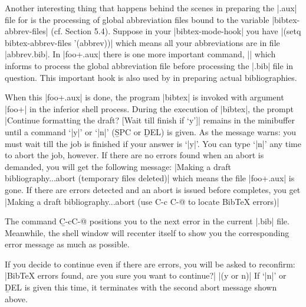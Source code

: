 Another interesting thing that happens behind the scenes in preparing
the |.aux| file for {\BibTeX} is the processing of global abbreviation files
bound to the variable |bibtex-abbrev-files| (cf. Section 5.4).
Suppose in your |bibtex-mode-hook| you have
\begindisplay
|(setq bibtex-abbrev-files '(abbrev))|\cr
\enddisplay
which means all your abbreviations are in file |abbrev.bib|.  In |foo+.aux|
there is one more important command,
\begindisplay
||\cr
\enddisplay
which informs {\BibTeX} to process the global abbreviation file before
processing the |.bib| file in question.  This important hook is
also used by {\TM} in preparing actual bibliographies.

When this |foo+.aux| is done,
the program |bibtex| is invoked with argument |foo+| in the
inferior shell process.  During the execution of |bibtex|,
the prompt
\begindisplay
|Continue formatting the draft? [Wait till finish if `y']|\cr
\enddisplay
remains in the minibuffer until a command `|y|' or `|n|' ({\b SPC} or
{\b DEL}) is given.  As the message warns: you must wait till the job
is finished if your answer is `|y|'.  You can type `|n|' any time
to abort the {\BibTeX} job, however.
If there are no errors found when an abort is demanded, you will get the
following message:
\begindisplay
|Making a draft bibliography...abort (temporary files deleted)|\cr
\enddisplay
which means the file |foo+.aux| is gone.  If there are errors detected
and an abort is issued before {\BibTeX} completes, you get
\begindisplay
|Making a draft bibliography...abort (use C-c C-@ to locate BibTeX errors)|\cr
\enddisplay

The command {\b C-c{\s}C-@} positions you to the next error in the current
|.bib| file.  Meanwhile, the shell window will recenter itself to show you
the corresponding error message as much as possible.

If you decide to continue even if there are {\BibTeX} errors, you will be
asked to reconfirm:
\begindisplay
|BibTeX errors found, are you sure you want to continue?| |(y or n)|\cr
\enddisplay
If `|n|' or {\b DEL} is given this time, it terminates with
the second abort message shown above.

